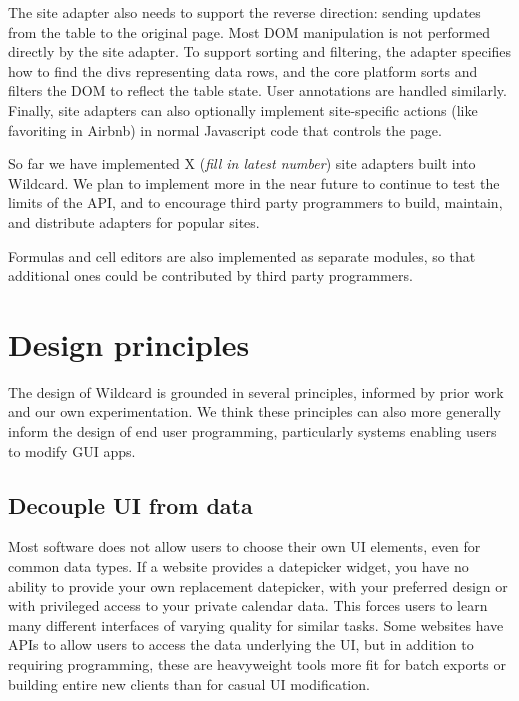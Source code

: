 \documentclass[english,submission]{programming}
\begin{document}
The site adapter also needs to support the reverse direction: sending
updates from the table to the original page. Most DOM manipulation is
not performed directly by the site adapter. To support sorting and
filtering, the adapter specifies how to find the divs representing data
rows, and the core platform sorts and filters the DOM to reflect the
table state. User annotations are handled similarly. Finally, site
adapters can also optionally implement site-specific actions (like
favoriting in Airbnb) in normal Javascript code that controls the page.

So far we have implemented X (\emph{fill in latest number}) site
adapters built into Wildcard. We plan to implement more in the near
future to continue to test the limits of the API, and to encourage third
party programmers to build, maintain, and distribute adapters for
popular sites.

Formulas and cell editors are also implemented as separate modules, so
that additional ones could be contributed by third party programmers.

\hypertarget{design-principles}{%
\section{Design principles}\label{design-principles}}

The design of Wildcard is grounded in several principles, informed by
prior work and our own experimentation. We think these principles can
also more generally inform the design of end user programming,
particularly systems enabling users to modify GUI apps.

\hypertarget{decouple-ui-from-data}{%
\subsection{Decouple UI from data}\label{decouple-ui-from-data}}

Most software does not allow users to choose their own UI elements, even
for common data types. If a website provides a datepicker widget, you
have no ability to provide your own replacement datepicker, with your
preferred design or with privileged access to your private calendar
data. This forces users to learn many different interfaces of varying
quality for similar tasks. Some websites have APIs to allow users to
access the data underlying the UI, but in addition to requiring
programming, these are heavyweight tools more fit for batch exports or
building entire new clients than for casual UI modification.
\end{document}
